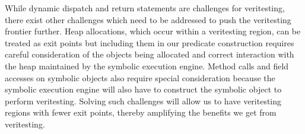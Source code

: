 While dynamic dispatch and return statements are challenges for veritesting, 
there exist other challenges which need to be addressed to push the veritesting
frontier further.
%
Heap allocations, which occur within a veritesting region, can be treated
as exit points but including them in our predicate construction requires
careful consideration of the objects being allocated and correct
interaction with the heap maintained by the symbolic execution engine.
%
Method calls and field accesses on symbolic objects also require special
consideration because the symbolic execution engine will also have to
construct the symbolic object to perform veritesting.
%
Solving such challenges will allow us to have veritesting regions with fewer
exit points, thereby amplifying the benefits we get from veritesting.
%

%
%
%
%
